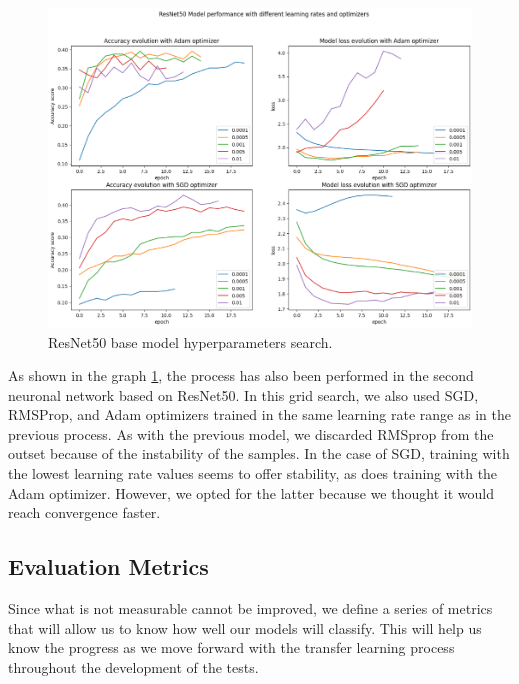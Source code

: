 \begin{figure}[ht]
    \begin{center}
        \includegraphics[scale=0.9]{images/Building/Hyperparameters/RestNet50_Model performance hyperparameters search.png}
        \caption{ResNet50 base model hyperparameters search.}
    \label{fig: ResNet50_hyperparameters}    
    \end{center}
\end{figure}

As shown in the graph \ref{fig: ResNet50_hyperparameters}, the process has also been performed in the second neuronal network based on ResNet50. In this grid search, we also used SGD, RMSProp, and Adam optimizers trained in the same learning rate range as in the previous process. As with the previous model, we discarded RMSprop from the outset because of the instability of the samples. In the case of SGD, training with the lowest learning rate values seems to offer stability, as does training with the Adam optimizer. However, we opted for the latter because we thought it would reach convergence faster. 


\newpage
\subsection{Evaluation Metrics}

Since what is not measurable cannot be improved, we define a series of metrics that will allow us to know how well our models will classify. This will help us know the progress as we move forward with the transfer learning process throughout the development of the tests. 


